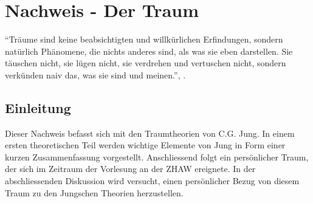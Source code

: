 %
%
\chapter*{Nachweis - Der Traum}\label{chap.traum}
\glsresetall
\par
\begingroup
\leftskip=1cm
\rightskip=1.5cm
\noindent \textquotedblleft Träume sind keine beabsichtigten und willkürlichen Erfindungen, sondern natürlich Phänomene, die nichts anderes sind, als was sie eben darstellen. Sie täuschen nicht, sie lügen nicht, sie verdrehen und vertuschen nicht, sondern verkünden naiv das, was sie sind und meinen.\textquotedblright, \cite{Jung:1972}.
\par
\endgroup
\section*{Einleitung}\label{section.einleitung}
Dieser Nachweis befasst sich mit den Traumtheorien von C.G. Jung. In einem ersten theoretischen Teil werden wichtige Elemente von Jung in Form einer kurzen Zusammenfassung vorgestellt. Anschliessend folgt ein persönlicher Traum, der sich im Zeitraum der Vorlesung an der ZHAW ereignete. In der abschliessenden Diskussion wird versucht, einen persönlicher Bezug von diesem Traum zu den Jungschen Theorien herzustellen.
